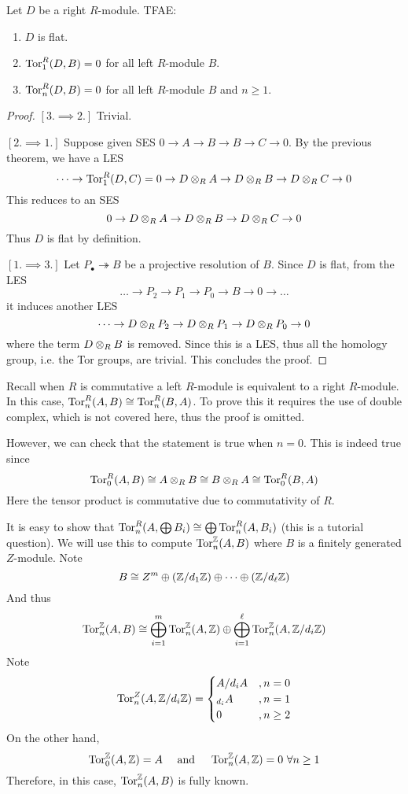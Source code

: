 \begin{pro} 
    Let $D$ be a right $R$-module. TFAE:
    \begin{enumerate}
        \item $D$ is flat.
        \item $\operatorname{Tor}_1^R(D,B)=0$ for all left $R$-module $B$.
        \item $\operatorname{Tor}_n^R(D,B)=0$ for all left $R$-module $B$ and $n\geq 1$.
    \end{enumerate}
\end{pro}
\begin{proof}
    \hfill

    $[3. \implies 2.]$ Trivial.

    $[2. \implies 1.]$ Suppose given SES $0\to A \to B \to B \to C \to 0$. By the previous theorem, we have a LES
    \[\dots \to \operatorname{Tor}_1^R(D,C)=0 \to D\otimes_R A \to D\otimes_R B\to D\otimes_R C\to 0\]
    This reduces to an SES
    \[0 \to D\otimes_R A \to D\otimes_R B\to D\otimes_R C\to 0\]
    Thus $D$ is flat by definition.

    $[1. \implies 3.]$ Let $P_\bullet \twoheadrightarrow B$ be a projective resolution of $B$. Since $D$ is flat, from the LES
    \[\dots \to P_2 \to P_1 \to P_0 \to B \to 0 \to \dots\]
    it induces another LES
    \[\dots \to D \otimes_R P_2 \to D \otimes_R P_1 \to D \otimes_R P_0 \to 0\]
    where the term $D\otimes_R B$ is removed. Since this is a LES, thus all the homology group, i.e. the Tor groups, are trivial. This concludes the proof.
\end{proof}

\begin{re}
    Recall when $R$ is commutative a left $R$-module is equivalent to a right $R$-module. In this case, $\operatorname{Tor}_n^R(A,B)\cong \operatorname{Tor}_n^R(B,A)$. To prove this it requires the use of double complex, which is not covered here, thus the proof is omitted.

    However, we can check that the statement is true when $n=0$. This is indeed true since 
    \[\operatorname{Tor}_0^R(A,B)\cong A\otimes_R B \cong B\otimes_R A \cong \operatorname{Tor}_0^R(B,A)\]
    Here the tensor product is commutative due to commutativity of $R$.
\end{re}

\medskip

\begin{ex}
    It is easy to show that $\operatorname{Tor}_n^R(A,\bigoplus B_i) \cong \bigoplus \operatorname{Tor}_n^R(A,B_i)$ (this is a tutorial question). We will use this to compute $\operatorname{Tor}_n^{\mathbb Z}(A,B)$ where $B$ is a finitely generated $Z$-module. Note
    \[B\cong Z^m \oplus ({\mathbb Z}/d_1{\mathbb Z}) \oplus \dots \oplus({\mathbb Z}/d_\ell {\mathbb Z})\]
    And thus
    \[\operatorname{Tor}_n^{\mathbb Z}(A,B)\cong \bigoplus_{i=1}^m \operatorname{Tor}^{\mathbb Z}_n(A,{\mathbb Z}) \oplus \bigoplus_{i=1}^\ell \operatorname{Tor}_n^{\mathbb Z}(A,{\mathbb Z}/d_i{\mathbb Z})\]
    Note 
    \[\operatorname{Tor}_n^Z(A,{\mathbb Z}/d_i{\mathbb Z})=
    \begin{cases}
        A/d_iA&, n=0\\
        _{d_i}A&, n=1\\
        0&, n\geq 2
    \end{cases}\]
    On the other hand,
    \[\operatorname{Tor}_0^{\mathbb Z}(A,{\mathbb Z})=A\quad \text{ and } \quad \operatorname{Tor}_n^{\mathbb Z}(A,{\mathbb Z})=0\ \forall n\geq 1\]
    Therefore, in this case, $\operatorname{Tor}_n^{\mathbb Z}(A,B)$ is fully known.
\end{ex}


